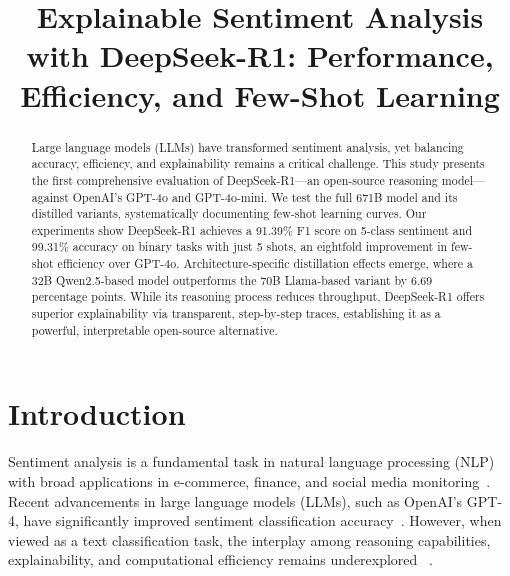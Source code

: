 \documentclass{IEEEcsmag}
\begin{document}
\title{Explainable Sentiment Analysis with DeepSeek-R1: Performance, Efficiency, and Few-Shot Learning}

\author{
}

\begin{abstract}

Large language models (LLMs) have transformed sentiment analysis, yet balancing accuracy, efficiency, and explainability remains a critical challenge. This study presents the first comprehensive evaluation of DeepSeek-R1—an open-source reasoning model—against OpenAI's GPT-4o and GPT-4o-mini. We test the full 671B model and its distilled variants, systematically documenting few-shot learning curves.
Our experiments show DeepSeek-R1 achieves a 91.39\% F1 score on 5-class sentiment and 99.31\% accuracy on binary tasks with just 5 shots, an eightfold improvement in few-shot efficiency over GPT-4o. Architecture-specific distillation effects emerge, where a 32B Qwen2.5-based model outperforms the 70B Llama-based variant by 6.69 percentage points. While its reasoning process reduces throughput, DeepSeek-R1 offers superior explainability via transparent, step-by-step traces, establishing it as a powerful, interpretable open-source alternative.



\end{abstract}

\maketitle
\vspace{-20pt}
\section{Introduction}
Sentiment analysis is a fundamental task in natural language processing (NLP) with broad applications in e-commerce, finance, and social media monitoring~\cite{wang2023mimusa,cambria2023seven}. Recent advancements in large language models (LLMs), such as OpenAI's GPT-4, have significantly improved sentiment classification accuracy~\cite{amin2024wide}. 
However, when viewed as a text classification task, the interplay among reasoning capabilities, explainability, and computational efficiency remains underexplored ~\cite{luo2024local}.
\end{document}
